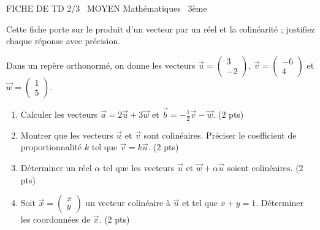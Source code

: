 \documentclass[11pt]{article}
\begin{document}
\begin{tcolorbox}[enhanced,colback=popink,colframe=popink,arc=10pt,boxrule=0pt,left=12pt,right=12pt,top=9pt,bottom=9pt]
{\color{white}\popxbold\small FICHE DE TD 2/3 \textbullet\ MOYEN \hfill Mathématiques \textbullet\ 3ème\par}
\end{tcolorbox}
\vspace{4pt}
Cette fiche porte sur le produit d'un vecteur par un réel et la colinéarité ; justifiez chaque réponse avec précision.

\begin{exercice}
Dans un repère orthonormé, on donne les vecteurs $\vec{u}=\begin{pmatrix} 3 \\ -2 \end{pmatrix}$, $\vec{v}=\begin{pmatrix} -6 \\ 4 \end{pmatrix}$ et $\vec{w}=\begin{pmatrix} 1 \\ 5 \end{pmatrix}$.
\begin{enumerate}
    \item Calculer les vecteurs $\vec{a}=2\vec{u}+3\vec{w}$ et $\vec{b}=-\frac{1}{2}\vec{v}-\vec{w}$. \hfill (2 pts)
    \item Montrer que les vecteurs $\vec{u}$ et $\vec{v}$ sont colinéaires. Préciser le coefficient de proportionnalité $k$ tel que $\vec{v}=k\vec{u}$. \hfill (2 pts)
    \item Déterminer un réel $\alpha$ tel que les vecteurs $\vec{u}$ et $\vec{w}+\alpha\vec{u}$ soient colinéaires. \hfill (2 pts)
    \item Soit $\vec{x}=\begin{pmatrix} x \\ y \end{pmatrix}$ un vecteur colinéaire à $\vec{u}$ et tel que $x+y=1$. Déterminer les coordonnées de $\vec{x}$. \hfill (2 pts)
\end{enumerate}
\end{exercice}
\end{document}
